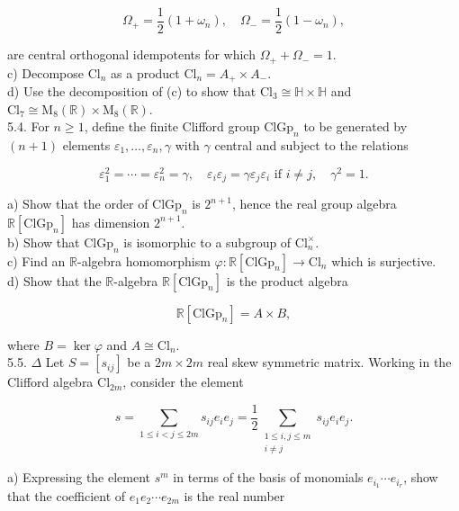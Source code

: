 \documentclass[10pt, letterpaper]{article}
\begin{document}
$$
\Omega_{+}=\frac{1}{2}\left(1+\omega_{n}\right), \quad \Omega_{-}=\frac{1}{2}\left(1-\omega_{n}\right),
$$

are central orthogonal idempotents for which $\Omega_{+}+\Omega_{-}=1$.\\
c) Decompose $\mathrm{Cl}_{n}$ as a product $\mathrm{Cl}_{n}=A_{+} \times A_{-}$.\\
d) Use the decomposition of (c) to show that $\mathrm{Cl}_{3} \cong \mathbb{H} \times \mathbb{H}$ and $\mathrm{Cl}_{7} \cong \mathrm{M}_{8}(\mathbb{R}) \times \mathrm{M}_{8}(\mathbb{R})$.\\
5.4. For $n \geqslant 1$, define the finite Clifford group $\mathrm{ClGp}_{n}$ to be generated by $(n+1)$ elements $\varepsilon_{1}, \ldots, \varepsilon_{n}, \gamma$ with $\gamma$ central and subject to the relations

$$
\varepsilon_{1}^{2}=\cdots=\varepsilon_{n}^{2}=\gamma, \quad \varepsilon_{i} \varepsilon_{j}=\gamma \varepsilon_{j} \varepsilon_{i} \text { if } i \neq j, \quad \gamma^{2}=1 .
$$

a) Show that the order of $\mathrm{ClGp}_{n}$ is $2^{n+1}$, hence the real group algebra $\mathbb{R}\left[\mathrm{ClGp}_{n}\right]$ has dimension $2^{n+1}$.\\
b) Show that $\mathrm{ClGp}_{n}$ is isomorphic to a subgroup of $\mathrm{Cl}_{n}^{\times}$.\\
c) Find an $\mathbb{R}$-algebra homomorphism $\varphi: \mathbb{R}\left[\mathrm{ClGp}_{n}\right] \longrightarrow \mathrm{Cl}_{n}$ which is surjective.\\
d) Show that the $\mathbb{R}$-algebra $\mathbb{R}\left[\mathrm{ClGp}_{n}\right]$ is the product algebra

$$
\mathbb{R}\left[\mathrm{ClGp}_{n}\right]=A \times B,
$$

where $B=\operatorname{ker} \varphi$ and $A \cong \mathrm{Cl}_{n}$.\\
5.5. $\Delta$ Let $S=\left[s_{i j}\right]$ be a $2 m \times 2 m$ real skew symmetric matrix. Working in the Clifford algebra $\mathrm{Cl}_{2 m}$, consider the element

$$
s=\sum_{1 \leqslant i<j \leqslant 2 m} s_{i j} e_{i} e_{j}=\frac{1}{2} \sum_{\substack{1 \leqslant i, j \leqslant m \\ i \neq j}} s_{i j} e_{i} e_{j} .
$$

a) Expressing the element $s^{m}$ in terms of the basis of monomials $e_{i_{1}} \cdots e_{i_{r}}$, show that the coefficient of $e_{1} e_{2} \cdots e_{2 m}$ is the real number
\end{document}
